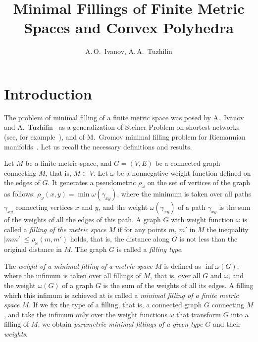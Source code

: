 \documentclass[10pt]{article}
\theoremstyle{plain}
\theoremstyle{definition}
\def\g{\gamma}
\def\om{\omega}
\begin{document}
\title{Minimal Fillings of Finite Metric Spaces and Convex Polyhedra}
\author{A.\,O.~Ivanov,  A.\,A.~Tuzhilin}

\date{}

\maketitle

\section{Introduction}
The problem of minimal filling of a finite metric space was posed by A.~Ivanov and A.~Tuzhilin~\cite{IT_MSb} as a generalization of Steiner Problem on shortest networks (see, for example~\cite{IT_UMN}), and of M.~Gromov minimal filling problem for Riemannian manifolds~\cite{Gromov}. Let us recall the necessary definitions and results.

Let $M$ be a finite metric space, and $G=(V,E)$ be a connected graph connecting $M$, that is, $M\subset V$. Let $\om$ be a nonnegative weight function defined on the edges of $G$. It generates a pseudometric $\rho_\om$ on the set of vertices of the graph as follows: $\rho_\om(x,y)=\min\om(\g_{xy})$, where the minimum is taken over all paths $\g_{xy}$ connecting vertices $x$ and $y$, and the weight $\om(\g_{xy})$ of a path $\g_{xy}$ is the sum of the weights of all the edges of this path. A graph $G$ with weight function $\om$ is called a \emph{filling of the metric space $M$} if for any points $m$, $m'$ in $M$ the inequality $|mm'|\le\rho_\om(m,m')$ holds, that is, the distance along $G$ is not less than the original distance in $M$. The graph $G$ is called a \emph{filling type}.

The \emph{weight of a minimal filling of a metric space $M$} is defined as $\inf \om(G)$, where the infimum is taken over all fillings of $M$, that is, over all $G$ and $\om$, and the weight $\om(G)$ of a graph $G$ is the sum of the weights of all its edges. A filling  which this infimum is achieved at is called a \emph{minimal filling of a finite metric space $M$}. If we fix the type of a filling, that is, a connected graph $G$ connecting $M$, and take the infimum only over the weight functions $\om$ that transform $G$ into a filling of $M$, we obtain\emph{ parametric minimal fillings of a given type $G$} and their \emph{weights}.
\end{document}
